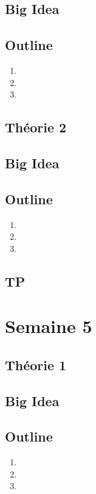 \documentclass{article}
\begin{document}
\subsection*{Big Idea}
\subsection*{Outline}
\begin{enumerate}
    \item
    \item
    \item
\end{enumerate}
\subsection{Théorie 2}
\subsection*{Big Idea}
\subsection*{Outline}
\begin{enumerate}
    \item
    \item
    \item
\end{enumerate}
\subsection{TP}

\pagebreak
\section{Semaine 5}
\subsection{Théorie 1}
\subsection*{Big Idea}
\subsection*{Outline}
\begin{enumerate}
    \item
    \item
    \item
\end{enumerate}
\end{document}
